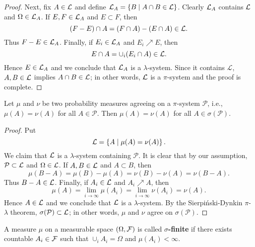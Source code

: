 \begin{proof}
    Next, fix $A\in\mathcal{L}$ and define $\mathcal{L}_A = \left\{ B \;\middle\vert\; A\cap B\in\mathcal{L} \right\}$. Clearly 
    $\mathcal{L}_A$ contains $\mathcal{L}$ and $\Omega\in\mathcal{L}_A$. If $E, F\in\mathcal{L}_A$ and $E\subset F$, then
    \begin{equation*}
        (F-E)\cap A = (F\cap A) - (E\cap A)\in\mathcal{L}. 
    \end{equation*}
    Thus $F-E\in\mathcal{L}_A$. Finally, if $E_i\in\mathcal{L}_A$ and $E_i\nearrow E$, then 
    \begin{equation*}
        E\cap A = \cup_i (E_i\cap A)\in\mathcal{L}. 
    \end{equation*}
    Hence $E\in\mathcal{L}_A$ and we conclude that $\mathcal{L}_A$ is a $\lambda$-system. 
    Since it contains $\mathcal{L}$, $A,B\in\mathcal{L}$ implies $A\cap B\in\mathcal{L}$; 
    in other words, $\mathcal{L}$ is a $\pi$-system and the proof is complete.
\end{proof}

\begin{corollary}\label{cor:measure_agree}
    Let $\mu$ and $\nu$ be two probability measures agreeing on a $\pi$-system 
    $\mathcal{P}$, i.e., $\mu(A) = \nu(A)$ for all $A\in\mathcal{P}$. 
    Then $\mu(A) = \nu(A)$ for all $A\in\sigma(\mathcal{P})$. 
\end{corollary}
\begin{proof}
    Put 
    \begin{equation*}
        \mathcal{L} = \left\{ A \;\middle\vert\; \mu(A) = \nu(A) \right\}.
    \end{equation*}
    We claim that $\mathcal{L}$ is a $\lambda$-system containing $\mathcal{P}$. 
    It is clear that by our assumption, $\mathcal{P}\subset\mathcal{L}$ and 
    $\Omega\in\mathcal{L}$. If $A,B\in\mathcal{L}$ and $A\subset B$, then 
    \begin{equation*}
        \mu(B-A) = \mu(B) - \mu(A) = \nu(B) - \nu(A) = \nu(B-A).
    \end{equation*}
    Thus $B-A\in\mathcal{L}$. Finally, if $A_i\in\mathcal{L}$ and $A_i\nearrow A$, then 
    \begin{equation*}
        \mu(A) = \lim_{i\to\infty} \mu(A_i) = \lim_{i\to\infty} \nu(A_i) = \nu(A).
    \end{equation*}
    Hence $A\in\mathcal{L}$ and we conclude that $\mathcal{L}$ is a $\lambda$-system. 
    By the Sierpi\'nski-Dynkin $\pi$-$\lambda$ theorem, 
    $\sigma(\mathcal{P})\subset\mathcal{L}$; in other words, $\mu$ and $\nu$ agree 
    on $\sigma(\mathcal{P})$.
\end{proof}

\begin{definition}
    A measure $\mu$ on a measurable space $(\Omega, \mathcal{F})$ is 
    called \textbf{$\sigma$-finite} if there exists countable 
    $A_i\in\mathcal{F}$ such that $\cup_i A_i = \Omega$ and $\mu(A_i)<\infty$.
\end{definition}


